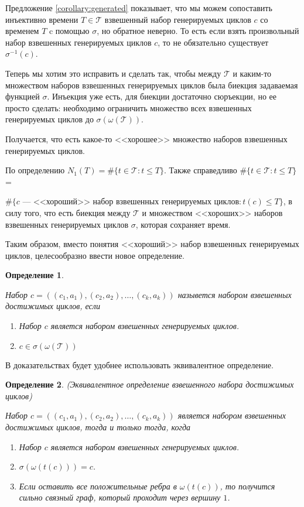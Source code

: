 \documentclass{article}
\makeatletter
\let\@msm@th@eqref\eqref
\renewcommand{\eqref}[1]{%
  \begingroup
  \leavevmode
  \color{violet}%
  \hypersetup{linkbordercolor=[named]{violet}}%
  \@msm@th@eqref{#1}%
  \endgroup
}
\newtheorem{definition}{Определение}
\makeatother
\begin{document}
Предложение \eqref{corollary:generated} показывает, что мы можем сопоставить инъективно времени $T \in \mathcal{T}$ взвешенный набор генерируемых циклов $c$ со временем $T$ c помощью $\sigma$, но обратное неверно. То есть если взять произвольный набор взвешенных генерируемых циклов $c$, то не обязательно существует $\sigma^{-1}(c)$. 

Теперь мы хотим это исправить и сделать так, чтобы между $\mathcal{T}$ и каким-то множеством наборов взвешенных генерируемых циклов была биекция задаваемая функцией $\sigma$. Инъекция уже есть, для биекции достаточно сюръекции, но ее просто сделать: необходимо ограничить множество всех взвешенных генерируемых циклов до $\sigma(\omega(\mathcal{T}))$.

Получается, что есть какое-то <<хорошее>> множество наборов взвешенных генерируемых циклов. 

По определению $N_{1}(T) = \#\{t \in \mathcal{T}: t \leq T\}$. 
Также справедливо
$\#\{t \in \mathcal{T}: t \leq T\}$ = 

\noindent
$\#\{c \text{ --- <<хороший>> набор взвешенных генерируемых циклов}: t(c) \leq T\}$, в силу того, что есть биекция между $\mathcal{T}$ и множеством <<хороших>> наборов взвешенных генерируемых циклов $\sigma$, которая сохраняет
время.

Таким образом, вместо понятия <<хороший>> набор взвешенных генерируемых циклов, целесообразно ввести новое определение.

\begin{definition} $ $
    \label{def:reachable_weighted_simple}
    
    Набор $c = ((c_{1}, a_{1}), (c_{2}, a_{2}), \ldots, (c_{k}, a_{k}))$ назывется набором взвешенных достижимых циклов, если
    \begin{enumerate}
         \item Набор $c$ является набором взвешенных генерируемых циклов.
         \item $c \in \sigma(\omega(\mathcal{T}))$  
    \end{enumerate}
\end{definition}

В доказательствах будет удобнее использовать эквивалентное определение.


\begin{definition} (Эквивалентное определение взвешенного набора достижимых циклов)
    \label{def:reachable_weighted}

    Набор $c = ((c_{1}, a_{1}), (c_{2}, a_{2}), \ldots, (c_{k}, a_{k}))$ является набором взвешенных достижимых циклов, тогда и только тогда, когда
    \begin{enumerate}
         \item Набор $c$ является набором взвешенных генерируемых циклов.
         \item $\sigma(\omega(t(c))) = c$.
         \item Если оставить все положительные ребра в $\omega(t(c))$, то получится сильно связный граф, который проходит через вершину $1$. 
    \end{enumerate}
\end{definition}
\end{document}
